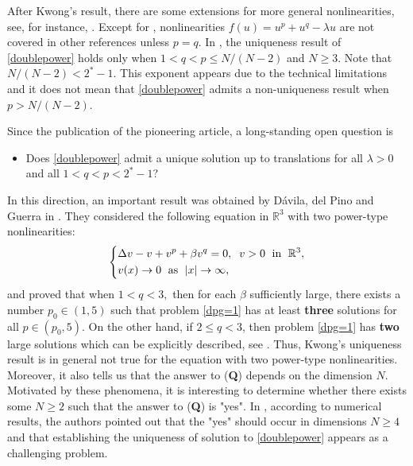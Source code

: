 \documentclass{article}
\theoremstyle{definition} \theoremstyle{remark}
\numberwithin{equation}{section}
\newcommand{\R}{\mathbb{R}}
\newcommand{\la}{\lambda}
\begin{document}
\vskip0.12in


	After Kwong's result, there are some extensions for more general nonlinearities, see, for instance, \cite{CL,KZ,M,ST}. Except for \cite{CL}, nonlinearities $f(u) = u^p + u^q - \la u$ are not covered in other references unless $p = q$. In \cite{CL}, the uniqueness result of \eqref{doublepower} holds only when $1 < q < p \le N/(N-2)$ and $N \ge 3$. Note that $N/(N-2) < 2^*-1$. This exponent appears due to the technical limitations and it does not mean that \eqref{doublepower} admits a non-uniqueness result when $p > N/(N-2)$.


\vskip0.12in


Since the publication of the pioneering article\cite{BL},	a long-standing open question  is
\begin{itemize}
\item[\large (\textbf{Q})] Does \eqref{doublepower} admit a unique solution up to translations for all $\la > 0$ and all $1 < q < p < 2^*-1$?
\end{itemize}
	In this direction, an important result was obtained  by D\'avila, del Pino and Guerra in \cite{DPG}. They considered the following equation in $\R^3$  with two power-type nonlinearities:
\begin{align}\label{dpg=1}
\left\{
\begin{aligned}
&\Delta v-v+v^p+\beta  v^q=0, \;\; v>0\;  \hbox{ in  } \; \R^3,\\
& v(x)\to 0\;  \hbox{ as } \; |x|\to \infty,
\end{aligned}
\right.
\end{align}
and proved that when $1<q<3,$ then for each $\beta $ sufficiently large, there exists a number $p_0\in (1, 5)$ such that problem \eqref{dpg=1} has at least {\bf three} solutions for
all $p\in (p_0, 5)$. On the other hand,  if $2\leq q < 3 $, then  problem \eqref{dpg=1} has  {\bf two} large solutions which can be explicitly described, see \cite[Theorems 1.1 and  1.3]{DPG}. Thus, Kwong's uniqueness result is in general not true for the equation with two power-type nonlinearities. Moreover, it also tells us that the answer to (\textbf{Q}) depends on the dimension $N$. Motivated by these phenomena, it is interesting to determine whether there exists some $ N \ge 2$ such that the answer to (\textbf{Q}) is "yes". In \cite{DPG}, according to numerical results, the authors pointed out that the "yes" should occur in dimensions $N \ge 4$ and that establishing the uniqueness of solution to \eqref{doublepower} appears as a challenging problem.
\end{document}
